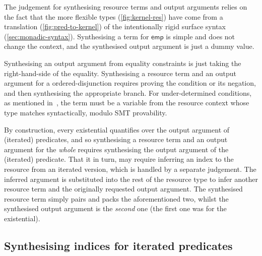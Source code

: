 The judgement for synthesising resource terms and output arguments relies on
the fact that the more flexible  types (\cref{fig:kernel-res})
have come from a translation (\cref{fig:pred-to-kernel}) of the intentionally
rigid surface syntax (\cref{sec:monadic-syntax}). Synthesising a term for
$\mathsf{emp}$ is simple and does not change the context, and the synthesised
output argument is just a dummy value.

Synthesising an output argument from equality constraints is just taking the right-hand-side of the
equality. Synthesising a resource term and an output argument for a
ordered-disjunction requires proving the condition or its negation, and then
synthesising the appropriate branch. For under-determined conditions, as
mentioned in~, the term must be a variable
from the resource context whose type matches syntactically, modulo SMT
provability.

By construction, every existential quantifies over the output argument of
(iterated) predicates, and so synthesising a resource term and an output
argument for the \emph{whole} requires synthesising the output argument of the
(iterated) predicate. That it in turn, may require inferring an index to the
resource from an iterated version, which is handled by a separate judgement.
The inferred argument is substituted into the rest of the resource type to
infer another resource term and the originally requested output argument. The
synthesised resource term simply pairs and packs the aforementioned two, whilst
the synthesised output argument is the \emph{second} one (the first one was for
the existential).

\subsection{Synthesising indices for iterated predicates}

